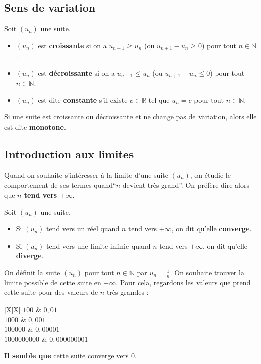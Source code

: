 	\subsection{Sens de variation}

	\begin{formula}[Définition]
		Soit $(u_n)$ une suite.
		\begin{itemize}
			\item $(u_n)$ est \textbf{croissante} si on a $u_{n+1} \geq u_n$ (ou $u_{n+1} - u_n \geq 0$) pour tout $n \in \mathbb{N}$.
			\item $(u_n)$ est \textbf{décroissante} si on a $u_{n+1} \leq u_n$ (ou $u_{n+1} - u_n \leq 0$) pour tout $n \in \mathbb{N}$.
			\item $(u_n)$ est dite \textbf{constante} s'il existe $c \in \mathbb{R}$ tel que $u_n = c$ pour tout $n \in \mathbb{N}$.
		\end{itemize}
	\end{formula}

	Si une suite est croissante ou décroissante et ne change pas de variation, alors elle est dite \textbf{monotone}.

	\subsection{Introduction aux limites}

	Quand on souhaite s'intéresser à la limite d'une suite $(u_n)$, on étudie le comportement de ses termes quand``$n$ devient très grand''. On préfère dire alors que \textbf{$n$ tend vers $+\infty$}.

	\begin{formula}[Définition]
		Soit $(u_n)$ une suite.
		\begin{itemize}
			\item Si $(u_n)$ tend vers un réel quand $n$ tend vers $+\infty$, on dit qu'elle \textbf{converge}.
			\item Si $(u_n)$ tend vers une limite infinie quand $n$ tend vers $+\infty$, on dit qu'elle \textbf{diverge}.
		\end{itemize}
	\end{formula}

	\begin{tip}[Exemple]
		On définit la suite $(u_n)$ pour tout $n \in \mathbb{N}$ par $u_n = \frac{1}{n}$. On souhaite trouver la limite possible de cette suite en $+ \infty$.
		\newline
		Pour cela, regardons les valeurs que prend cette suite pour des valeurs de $n$ très grandes :
		\newpar
		\begin{whitetabularx}{|X|X|}
			\hline
			$100$ & $0,01$ \\
			\hline
			$1 000$ & $0,001$ \\
			\hline
			$100 000$ & $0,000 01$ \\
			\hline
			$1 000 000 000$ & $0,000 000 001$ \\
			\hline
		\end{whitetabularx}
		\newpar
		\textbf{Il semble que} cette suite converge vers 0.
	\end{tip}

